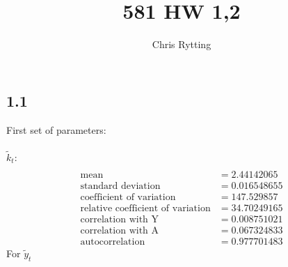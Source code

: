 \documentclass[letterpaper,12pt]{article}
\theoremstyle{definition}
\begin{document}
\title{581 HW 1,2}
\author{Chris Rytting}
\maketitle

\subsection*{1.1}

First set of parameters:\\
\\
$\tilde{k}_t$:
\begin{align*}
\\\text{mean} &= 2.44142065	
\\\text{standard deviation} &= 0.016548655
\\\text{coefficient of variation}&=147.529857	
\\\text{relative coefficient of variation}&=34.70249165
\\\text{correlation with Y}&=0.008751021
\\\text{correlation with A}&=0.067324833
\\\text{autocorrelation}&=0.977701483
\end{align*}
For $\tilde{y}_t$ 
\end{document}
